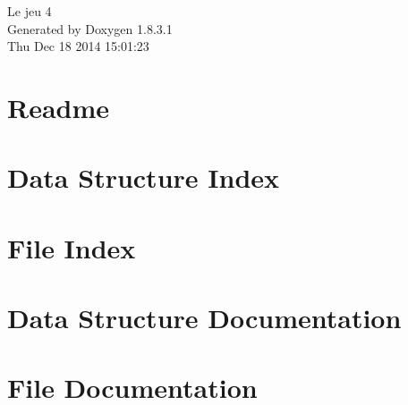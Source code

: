 \documentclass{book}
\begin{document}
\hypersetup{pageanchor=false,citecolor=blue}
\begin{titlepage}
\vspace*{7cm}
\begin{center}
{\Large Le jeu 4 }\\
\vspace*{1cm}
{\large Generated by Doxygen 1.8.3.1}\\
\vspace*{0.5cm}
{\small Thu Dec 18 2014 15:01:23}\\
\end{center}
\end{titlepage}
\clearemptydoublepage
{}
\tableofcontents
\clearemptydoublepage
{}
\hypersetup{pageanchor=true,citecolor=blue}
\chapter{Readme}
\label{md_Readme}
\hypertarget{md_Readme}{}

\chapter{Data Structure Index}

\chapter{File Index}

\chapter{Data Structure Documentation}







\chapter{File Documentation}







\printindex
\end{document}
